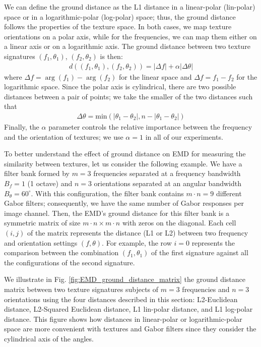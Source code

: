 We can define the ground distance as the L1 distance in a linear-polar (lin-polar) space or in a logarithmic-polar (log-polar) space; thus, the ground distance follows the properties of the texture space. In both cases, we map texture orientations on a polar axis, while for the frequencies, we can map them either on a linear axis or on a logarithmic axis. The ground distance between two texture signatures $(f_1, \theta_1)$, $(f_2, \theta_2)$ is then:
\begin{eqnarray} \label{eq:emd_lin_log_polar}
	d((f_1, \theta_1), (f_2, \theta_2)) = |\Delta f| + \alpha |\Delta \theta|
\end{eqnarray}
where $\Delta f = \arg{(f_1)} - \arg{(f_2)}$ for the linear space and $\Delta f = f_1 - f_2$ for the logarithmic space. Since the polar axis is cylindrical, there are two possible distances between a pair of points; we take the smaller of the two distances such that
\begin{eqnarray} \label{eq:emd_ground_dist_polar_axis}
	\Delta \theta = \mathrm{min}(|\theta_1-\theta_2|, n-|\theta_1-\theta_2|) \nonumber
\end{eqnarray}
Finally, the $\alpha$ parameter controls the relative importance between the frequency and the orientation of textures; we use $\alpha=1$ in all of our experiments.

To better understand the effect of ground distance on EMD for measuring the similarity between textures, let us consider the following example. We have a filter bank formed by $m = 3$ frequencies separated at a frequency bandwidth $B_f = 1$ (1 octave) and $n = 3$ orientations separated at an angular bandwidth $B_\theta = 60^\circ$. With this configuration, the filter bank contains $ m \cdot n = 9 $ different Gabor filters; consequently, we have the same number of Gabor responses per image channel. Then, the EMD's ground distance for this filter bank is a symmetric matrix of size $ m \cdot n \times m \cdot n $ with zeros on the diagonal. Each cell $(i, j)$ of the matrix represents the distance (L1 or L2) between two frequency and orientation settings $(f,\theta)$. For example, the row $i = 0$ represents the comparison between the combination $(f_1, \theta_1)$ of the first signature against all the configurations of the second signature.

We illustrate in Fig. \ref{fig:EMD_ground_distance_matrix} the ground distance matrix between two texture signatures subjects of $m = 3$ frequencies and $n = 3$ orientations using the four distances described in this section: L2-Euclidean distance, L2-Squared Euclidean distance, L1 lin-polar distance, and L1 log-polar distance. This figure shows how distances in linear-polar or logarithmic-polar space are more convenient with textures and Gabor filters since they consider the cylindrical axis of the angles.

